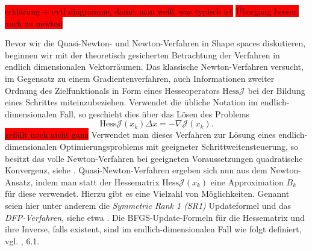 \documentclass[bibliography=totoc,12pt,a4paper]{scrartcl}
\theoremstyle{exampstyle}
\numberwithin{equation}{section}
\begin{document}
\colorbox{red}{erklärung + evtl diagramme, damit man weiß, was typisch ist}
\colorbox{red}{Übergang besser, auch zu newton}


Bevor wir die Quasi-Newton- und Newton-Verfahren in Shape spaces diskutieren, beginnen wir mit der theoretisch gesicherten Betrachtung der Verfahren in endlich dimensionalen Vektorräumen. Das klassische Newton-Verfahren versucht, im Gegensatz zu einem Gradientenverfahren, auch Informationen zweiter Ordnung des Zielfunktionals in Form eines Hesseoperators $\text{Hess} \mathcal{J}$ bei der Bildung eines Schrittes miteinzubeziehen. Verwendet die übliche Notation im endlich-dimensionalen Fall, so geschieht dies über das Lösen des Problems
\begin{equation}\label{newtonfinite}
	\text{Hess} \mathcal{J} (x_k)\Delta x = - \nabla \mathcal{J}(x_k).
\end{equation}
\colorbox{red}{gefällt noch nicht ganz}
Verwendet man dieses Verfahren zur Lösung eines endlich-dimensionalen Optimierungsproblems mit geeigneter Schrittweitensteuerung, so besitzt das volle Newton-Verfahren bei geeigneten Voraussetzungen quadratische Konvergenz, siehe \cite{Nocedal}. Quasi-Newton-Verfahren ergeben sich nun aus dem Newton-Ansatz, indem man statt der Hessematrix $\text{Hess}\mathcal{J}(x_k)$ eine Approximation $B_k$ für diese verwendet. Hierzu gibt es eine Vielzahl von Möglichkeiten. Genannt seien hier unter anderem die \textit{Symmetric Rank 1 (SR1)} Updateformel und das \textit{DFP-Verfahren}, siehe etwa \cite{Nocedal}. Die BFGS-Update-Formeln für die Hessematrix und ihre Inverse, falls existent, sind im endlich-dimensionalen Fall wie folgt definiert, vgl. \cite{Nocedal}, 6.1.
\end{document}

